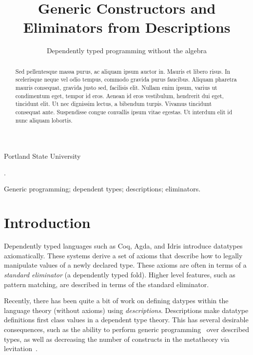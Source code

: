 \documentclass[preprint,nonatbib]{sigplanconf}
\begin{document}
\setlength{\pdfpageheight}{\paperheight}
\setlength{\pdfpagewidth}{\paperwidth}


\title{Generic Constructors and Eliminators from Descriptions}
\subtitle{Dependently typed programming without the algebra}

           {Portland State University}

\maketitle

\begin{abstract}
Sed pellentesque massa purus, ac aliquam ipsum auctor in. Mauris et
libero risus. In scelerisque neque vel odio tempus, commodo gravida
purus faucibus. Aliquam pharetra mauris consequat, gravida justo sed,
facilisis elit. Nullam enim ipsum, varius ut condimentum eget, tempor
id eros. Aenean id eros vestibulum, hendrerit dui eget, tincidunt
elit. Ut nec dignissim lectus, a bibendum turpis. Vivamus tincidunt
consequat ante. Suspendisse congue convallis ipsum vitae egestas. Ut
interdum elit id nunc aliquam lobortis.
\end{abstract}

.

\keywords
Generic programming; dependent types; descriptions; eliminators.

\section{Introduction}
\label{sec:intro}
Dependently typed languages such as Coq, Agda, and  Idris introduce datatypes axiomatically.
These systems derive a set of axioms that describe how to legally manipulate values of 
a newly declared type.
These axioms are often in terms of a {\it standard eliminator} (a dependently typed fold). 
Higher level features, such as pattern matching, are described in terms
of the standard eliminator.

Recently, there has been quite a bit of work on defining datypes within the language
theory (without axioms) using {\it descriptions}.
Descriptions make datatype definitions first class values in a
dependent type theory. This has several desirable consequences, such as the
ability to perform generic programming~\citep{Chapman:2010:GAL:1932681.1863547,mcbride2010ornamental,dagand:phd}
over described types, as well as decreasing the number of constructs in the
metatheory via levitation~\citep{Chapman:2010:GAL:1932681.1863547,dagand:phd}. 
\end{document}
